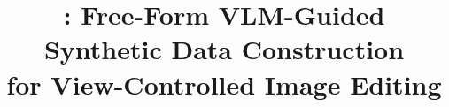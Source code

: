 \documentclass{article}
\title{\aris: Free-Form VLM-Guided Synthetic Data Construction\\
       for View-Controlled Image Editing}
\author{
}
\begin{document}
\maketitle

\begin{abstract}

\end{abstract}

















\end{document}
